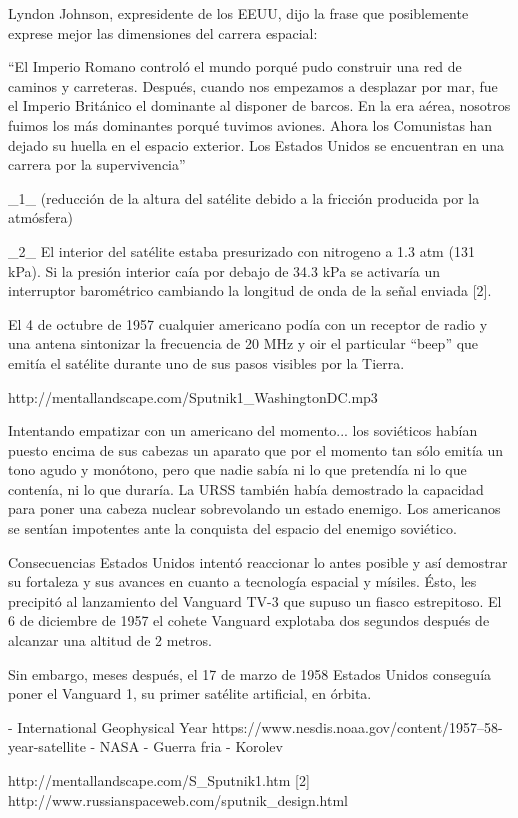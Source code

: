 Lyndon Johnson, expresidente de los EEUU, dijo la frase que posiblemente exprese mejor las dimensiones del carrera espacial:

``El Imperio Romano controló el mundo porqué pudo construir una red de caminos y carreteras. Después, cuando nos empezamos a desplazar por mar, fue el Imperio Británico el dominante al disponer de barcos. En la era aérea, nosotros fuimos los más dominantes porqué tuvimos aviones. Ahora los Comunistas han dejado su huella en el espacio exterior. Los Estados Unidos se encuentran en una carrera por la supervivencia''

_1_
(reducción de la altura del satélite debido a la fricción producida por la atmósfera)

_2_
El interior del satélite estaba presurizado con nitrogeno a 1.3 atm (131 kPa). Si la presión interior caía por debajo de 34.3 kPa se activaría un interruptor barométrico cambiando la longitud de onda de la señal enviada [2].

El 4 de octubre de 1957 cualquier americano podía con un receptor de radio y una antena sintonizar la frecuencia de 20 MHz y oir el particular ``beep'' que emitía el satélite durante uno de sus pasos visibles por la Tierra.

http://mentallandscape.com/Sputnik1_WashingtonDC.mp3

Intentando empatizar con un americano del momento... los soviéticos habían puesto encima de sus cabezas un aparato que por el momento tan sólo emitía un tono agudo y monótono, pero que nadie sabía ni lo que pretendía ni lo que contenía, ni lo que duraría. La URSS también había demostrado la capacidad para poner una cabeza nuclear sobrevolando un estado enemigo. Los americanos se sentían impotentes ante la conquista del espacio del enemigo soviético. 


Consecuencias
Estados Unidos intentó reaccionar lo antes posible y así demostrar su fortaleza y sus avances en cuanto a tecnología espacial y mísiles. Ésto, les precipitó al lanzamiento del Vanguard TV-3 que supuso un fiasco estrepitoso. El 6 de diciembre de 1957 el cohete Vanguard explotaba dos segundos después de alcanzar una altitud de 2 metros.

Sin embargo, meses después, el 17 de marzo de 1958 Estados Unidos conseguía poner el Vanguard 1, su primer satélite artificial, en órbita.

- International Geophysical Year 
	https://www.nesdis.noaa.gov/content/1957–58-year-satellite
- NASA
- Guerra fria
- Korolev


http://mentallandscape.com/S_Sputnik1.htm
[2] http://www.russianspaceweb.com/sputnik_design.html